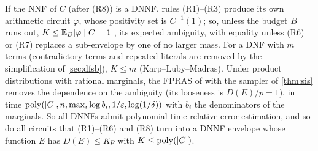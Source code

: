 \begin{proposition}\label{prop:dnnf-env}
If the NNF of $C$ (after (R8)) is a DNNF, rules (R1)--(R3) produce its own
arithmetic circuit $\varphi$, whose positivity set is $C^{-1}(1)$; so, unless the
budget $B$ runs out, $K\le\mathbb{E}_D[\varphi\mid C=1]$, its expected ambiguity, with
equality unless (R6) or (R7) replaces a sub-envelope by one of no larger mass. For
a DNF with $m$ terms (contradictory terms and repeated literals are removed by the
simplification of \cref{sec:dfsb}), $K\le m$
(Karp--Luby--Madras). Under product distributions with rational marginals, the
FPRAS of \cite{meel2026dnnf} with the sampler of \cref{thm:sis} removes the
dependence on the ambiguity (its looseness is $D(E)/p=1$), in time
$\mathrm{poly}(|C|,n,\max_i\log b_i,1/\varepsilon,\log(1/\delta))$ with $b_i$ the denominators of
the marginals. So all DNNFs admit polynomial-time relative-error estimation, and so
do all circuits that (R1)--(R6) and (R8) turn into a DNNF envelope whose function
$E$ has $D(E)\le Kp$ with $K\le\mathrm{poly}(|C|)$.
\end{proposition}


